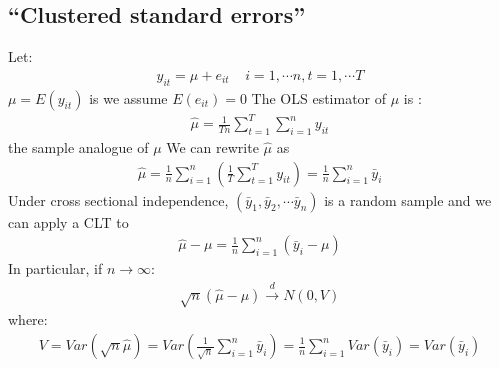 \documentclass[a4paper,twoside,11pt]{article}
\begin{document}
\subsection{“Clustered standard errors”}
\begin{shaded*}
\noindent Let:
\begin{equation*}
\begin{aligned}
y_{it} = \mu + e_{it} \ \ \ \ \ i=1,\cdots n , t = 1, \cdots T
\end{aligned} 
\end{equation*}
$\mu = E(y_{it})$ is we assume $E(e_{it}) =0$ 
\newline
\newline
The OLS estimator of $\mu$ is :
\begin{equation*}
\begin{aligned}
\hat{\mu} = \frac{1}{Tn} \sum^T_{t=1} \sum^n_{i=1} y_{it}
\end{aligned} 
\end{equation*}
the sample analogue of $\mu$
\newline
\newline
We can rewrite $\hat \mu$ as 
\begin{equation*}
\begin{aligned}
\hat{\mu} = \frac{1}{n} \sum^n_{i=1} (\frac{1}{T} \sum^T_{t=1} y_{it} ) = \frac{1}{n} \sum^n_{i=1} \bar y_i
\end{aligned} 
\end{equation*}
Under cross sectional independence, $(\bar y_1, \bar y_2, \cdots \bar y_n)$ is a random sample and we can apply a CLT to
\begin{equation*}
\begin{aligned}
\hat{\mu} - \mu = \frac{1}{n} \sum^n_{i=1} (\bar y_i - \mu)
\end{aligned} 
\end{equation*}
In particular, if $n \rightarrow \infty$:
\begin{equation*}
\begin{aligned}
\sqrt{n} (\hat{\mu} - \mu) \overset{d}{\rightarrow} N(0,V)
\end{aligned} 
\end{equation*}
where:
\begin{equation*}
\begin{aligned}
V = Var(\sqrt{n} \hat{\mu}) = Var(\frac{1}{\sqrt{n}} \sum^n_{i=1} \bar y_i ) = \frac{1}{n} \sum^n_{i=1} Var(\bar y_i) = Var(\bar y_i)
\end{aligned} 
\end{equation*}

\end{shaded*}
\end{document}
